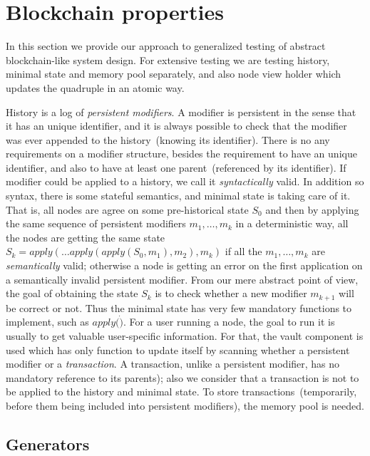 
\section{Blockchain properties}
\label{sec:props}

In this section we provide our approach to generalized testing of abstract blockchain-like system design. For extensive testing we are  testing history, minimal state and memory pool separately, and also node view holder which updates the quadruple {\em <history, minimal state, vault, memory pool>} in an atomic way.

History is a log of {\em persistent modifiers}. A modifier is persistent in the sense that it has an unique identifier, and it is always possible to check that the modifier was ever appended to the history~(knowing its identifier). There is no any requirements on a modifier structure, besides the requirement to have an unique identifier, and also to have at least one parent~(referenced by its identifier). If modifier could be applied to a history, we call it {\em syntactically} valid. In addition so syntax, there is some stateful semantics, and minimal state is taking care of it. That is, all nodes are agree on some pre-historical state $S_0$ and then by applying the same sequence of persistent modifiers $m_1, \ldots, m_k$ in a deterministic way, all the nodes are getting the same state $S_k = apply(\ldots apply(apply(S_0, m_1), m_2), m_k)$ if all the $m_1, \ldots, m_k$ are {\em semantically} valid; otherwise a node is getting an error on the first application on a semantically invalid persistent modifier. From our mere abstract point of view, the goal of obtaining the state $S_k$ is to check whether a new modifier $m_{k+1}$ will be correct or not. Thus the minimal state has very few mandatory functions to implement, such as $apply(\dot)$. For a user running a node, the goal to run it is usually to get valuable user-specific information. For that, the vault component is used which has only function to update itself by scanning whether a persistent modifier or a {\em transaction}. A transaction, unlike a persistent modifier, has no mandatory reference to its parents); also we consider that a transaction is not to be applied to the history and minimal state. To store transactions~(temporarily, before them being included into persistent modifiers), the memory pool is needed.      


\subsection{Generators}

